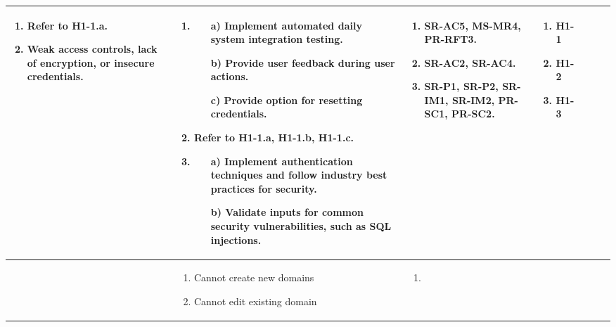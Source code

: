 \documentclass{article}
\begin{document}
\begin{landscape}
\begin{longtable}{|p{2cm}|p{4cm}|p{4cm}|p{4cm}|p{4cm}|p{2cm}|p{2cm}|}
\begin{enumerate}[leftmargin=*]
    \item Refer to H1-1.a.
    \item Weak access controls, lack of encryption, or insecure credentials.
  \end{enumerate} &
  \begin{enumerate}[leftmargin=*]
    \item 
    \begin{enumerate}
        \item[a)] Implement automated daily system integration testing.
        \item[b)] Provide user feedback during user actions.
        \item[c)] Provide option for resetting credentials.
    \end{enumerate}
    \item Refer to H1-1.a, H1-1.b, H1-1.c.
    \item 
    \begin{enumerate}
        \item[a)] Implement authentication techniques and follow industry best practices for security.
        \item[b)] Validate inputs for common security vulnerabilities, such as SQL injections.
    \end{enumerate}
  \end{enumerate} &
  \begin{enumerate}[leftmargin=*]
    \item SR-AC5, MS-MR4, PR-RFT3.
    \item SR-AC2, SR-AC4.
    \item SR-P1, SR-P2, SR-IM1, SR-IM2, PR-SC1, PR-SC2.
  \end{enumerate} &
  \begin{enumerate}[leftmargin=*]
    \item H1-1
    \item H1-2
    \item H1-3
  \end{enumerate} \\
  \hline
   & 
  \begin{enumerate}[leftmargin=*]
      \item Cannot create new domains
      \item Cannot edit existing domain
  \end{enumerate} & 
  \begin{enumerate}[leftmargin=*]
    \item

\end{enumerate}
\end{longtable}
\end{landscape}
\end{document}

